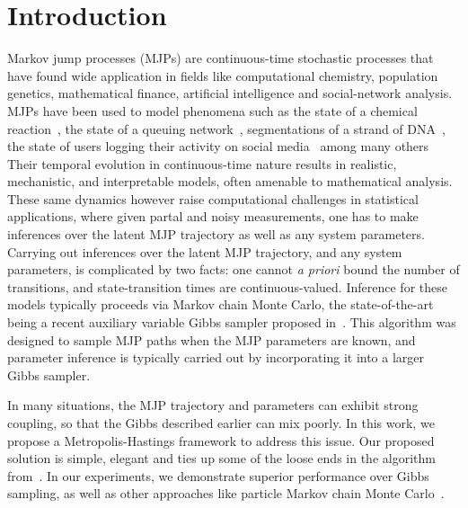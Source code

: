 \section{Introduction}
\label{sec:intro}
Markov jump processes (MJPs) are continuous-time stochastic processes that
have found wide application in fields like computational chemistry, 
population genetics, mathematical finance, artificial intelligence and
social-network analysis. MJPs have been used to model phenomena such 
as the state of a chemical reaction~\cite{a}, the state of a queuing 
network~\cite{a}, segmentations of a strand of DNA~\cite{a}, the state of 
users logging their activity on social media~\cite{a} among many others
Their temporal evolution in continuous-time nature results
in realistic, mechanistic, and interpretable models, often amenable to 
mathematical analysis.  These same dynamics however raise computational
challenges in statistical applications, where given partal and noisy 
measurements,
one has to make inferences over  the latent MJP trajectory as well
as any system parameters. Carrying out inferences over the 
latent MJP trajectory, and any system parameters, is complicated by two
facts: one cannot {\em a priori} bound the number of transitions, and 
state-transition times are continuous-valued. Inference for these models 
typically proceeds via Markov chain Monte Carlo, the state-of-the-art 
being a recent auxiliary variable Gibbs sampler proposed 
in~\cite{RaoTeh13}.  This algorithm was designed to sample MJP paths 
when the MJP parameters 
are known, and parameter inference is typically carried out by 
incorporating it into a larger Gibbs sampler. 

In many situations, the MJP trajectory and parameters can exhibit strong 
coupling, so that the Gibbs described earlier can mix poorly.  
In this work, we propose a Metropolis-Hastings framework to address
this issue. Our proposed solution is simple, elegant and ties
up some of the loose ends in the algorithm from~\cite{RaoTeh13}.
In our experiments, we demonstrate superior performance over Gibbs
sampling, as well as other approaches like particle Markov chain Monte 
Carlo~\cite{Andrieu10}.

